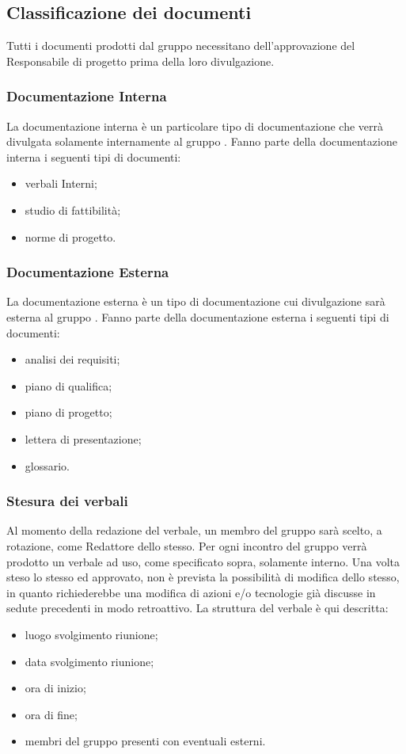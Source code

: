 \subsection{Classificazione dei documenti}
Tutti i documenti prodotti dal gruppo {\Gruppo} necessitano dell’approvazione del Responsabile di progetto prima della loro divulgazione.

\subsubsection{Documentazione Interna}
La documentazione interna è un particolare tipo di documentazione che verrà divulgata solamente internamente al gruppo {\Gruppo}. Fanno parte della documentazione interna i seguenti tipi di documenti:
\begin{itemize}
	\item verbali Interni;
	\item studio di fattibilità;
	\item norme di progetto.
\end{itemize}

\subsubsection{Documentazione Esterna}
La documentazione esterna è un tipo di documentazione cui divulgazione sarà esterna al gruppo {\Gruppo}. Fanno parte della documentazione esterna i seguenti tipi di documenti:
\begin{itemize}
	\item analisi dei requisiti;
	\item piano di qualifica;
	\item piano di progetto;
	\item lettera di presentazione;
	\item glossario.
\end{itemize}

\subsubsection{Stesura dei verbali}
Al momento della redazione del verbale, un membro del gruppo {\Gruppo} sarà scelto, a rotazione, come Redattore dello stesso. Per ogni incontro del gruppo verrà prodotto un verbale ad uso, come specificato sopra, solamente interno. Una volta steso lo stesso ed approvato, non è prevista la possibilità di modifica dello stesso, in quanto richiederebbe una modifica di azioni e/o tecnologie già discusse in sedute precedenti in modo retroattivo. La struttura del verbale è qui descritta:
\begin{itemize}
	\item luogo svolgimento riunione;
	\item data svolgimento riunione;
	\item ora di inizio;
	\item ora di fine;
	\item membri del gruppo presenti con eventuali esterni.
\end{itemize}

